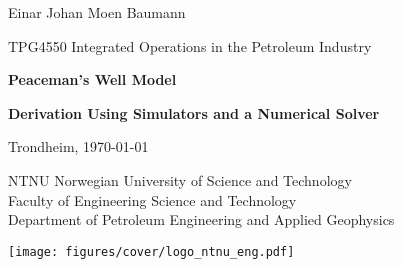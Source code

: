 
\hskip 2.5cm
\begin{minipage}[]{8cm}
    \LARGE
    Einar Johan Moen Baumann
\end{minipage}

\vskip 1cm
\hskip 3.5cm
\begin{minipage}[]{8cm}
    \Large
    TPG4550 Integrated Operations in the Petroleum Industry
\end{minipage}

\vskip 0.75cm
\hskip 3.5cm
\begin{minipage}[]{8cm}
    \huge \bfseries
    Peaceman's Well Model
\end{minipage}

\vskip 0.75cm
\hskip 3.5cm
\begin{minipage}[]{8cm}
    \LARGE \bfseries
    Derivation Using Simulators and a Numerical Solver
\end{minipage}

\vskip 0.75cm
\hskip 3.5cm
\begin{minipage}[]{8cm}
    \large
    Trondheim, \today
\end{minipage}

\vskip 1.25cm
\hskip 3cm
\begin{minipage}[]{10cm}
    \normalsize
    NTNU Norwegian University of Science and Technology \\
    Faculty of Engineering Science and Technology \\
    Department of Petroleum Engineering and Applied Geophysics
\end{minipage}





\vskip 10cm
\texttt{[image: figures/cover/logo\_ntnu\_eng.pdf]}

\thispagestyle{empty}
